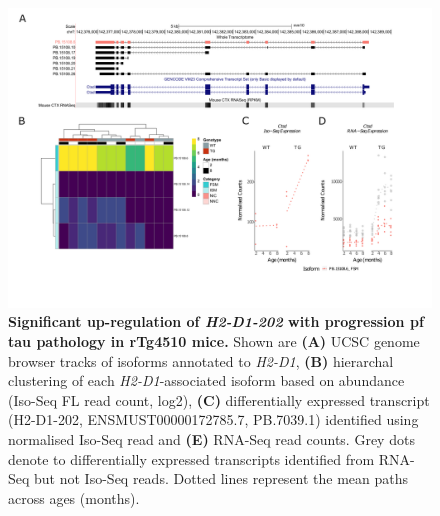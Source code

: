 \begin{landscape}
	\begin{figure}[!htp]
		\centering
		\includegraphics[page=2,trim={1.5cm 3.5cm 2cm 1cm}, scale = 0.85]{Figures/Ch5_DiffPlots_Landscape.pdf}
		\captionsetup{width=1.5\textwidth}
		\caption[Differential \textit{H2-D1} transcript expression]%
		{\textbf{Significant up-regulation of \textit{H2-D1-202} with progression pf tau pathology in rTg4510 mice.} Shown are \textbf{(A)} UCSC genome browser tracks of isoforms annotated to \textit{H2-D1}, \textbf{(B)} hierarchal clustering of each \textit{H2-D1}-associated isoform based on abundance (Iso-Seq FL read count, log2), \textbf{(C)} differentially expressed transcript (H2-D1-202, ENSMUST00000172785.7, PB.7039.1) identified using normalised Iso-Seq read and \textbf{(E)} RNA-Seq read counts. Grey dots denote to differentially expressed transcripts identified from RNA-Seq but not Iso-Seq reads. Dotted lines represent the mean paths across ages (months).}   
		\label{fig:H2D1}
	\end{figure}	
\end{landscape}

